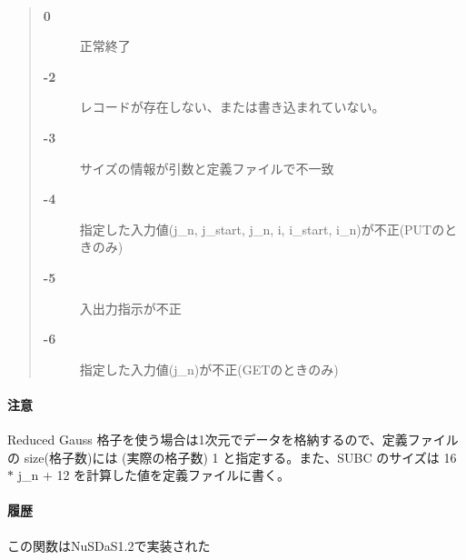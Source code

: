 \paragraph{\ResultCode}
\begin{quote}
\begin{description}
\item[{\bf 0}] 正常終了
\item[{\bf -2}] レコードが存在しない、または書き込まれていない。
\item[{\bf -3}] サイズの情報が引数と定義ファイルで不一致
\item[{\bf -4}] 指定した入力値(j\_n, j\_start, j\_n, i, i\_start, i\_n)が不正(PUTのときのみ)
\item[{\bf -5}] 入出力指示が不正
\item[{\bf -6}] 指定した入力値(j\_n)が不正(GETのときのみ)
\end{description}\end{quote}
\paragraph{ 注意 }
Reduced Gauss 格子を使う場合は1次元でデータを格納するので、定義ファイルの
size(格子数)には (実際の格子数) 1 と指定する。また、SUBC のサイズは 
16 $\ast$ j\_n + 12 を計算した値を定義ファイルに書く。
\paragraph{ 履歴 }
この関数はNuSDaS1.2で実装された
